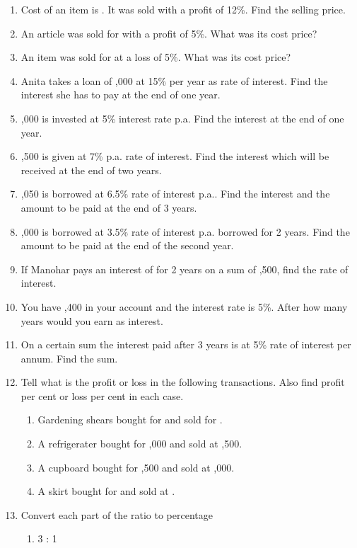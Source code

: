 \begin{enumerate}[label=\thesection.\arabic*,ref=\thesection.\theenumi,resume*]
\item  Cost of an item is . It was sold with a profit of 12\%. Find the selling price. 
\item  An article was sold for  with a profit of 5\%. What was its cost price? 
\item  An item was sold for  at a loss of 5\%. What was its cost price?
\item Anita takes a loan of ,000 at 15\% per year as rate of interest. Find the interest she has to pay at the end of one year.
\item {},000 is invested at 5\% interest rate p.a. Find the interest at the end of one year.
\item  {},500 is given at 7\% p.a. rate of interest. Find the interest which will be received at the end of two years.
\item  {},050 is borrowed at 6.5\% rate of interest p.a.. Find the interest and the amount to be paid at the end of 3 years.
\item  {},000 is borrowed at 3.5\% rate of interest p.a. borrowed for 2 years. Find the amount to be paid at the end of the second year.
\item If Manohar pays an interest of  for 2 years on a sum of ,500, find the rate of interest.
\item You have ,400 in your account and the interest rate is 5\%. After how many years would you earn  as interest.
\item On a certain sum the interest paid after 3 years is  at 5\% rate of interest per annum. Find the sum.
\item Tell what is the profit or loss in the following transactions. Also find profit per cent or loss per cent in each case. 
	\begin{enumerate}
\item  Gardening shears bought for  and sold for . 
\item  A refrigerater bought for ,000 and sold at ,500. 
\item  A cupboard bought for ,500 and sold at ,000. 
\item  A skirt bought for  and sold at .
	\end{enumerate}
\item Convert each part of the ratio to percentage
	\begin{enumerate}
		\item  3 : 1

\end{enumerate}
\end{enumerate}
